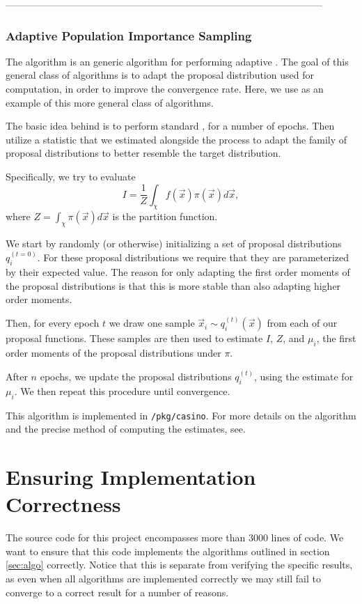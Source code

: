 \documentclass[10pt, a4paper]{article}
\begin{document}
  --------------------------------------------------------------------------------------------------

  \subsubsection{Adaptive Population Importance Sampling}
  The \apis{} algorithm is an generic algorithm for performing adaptive \is{}. The goal
  of this general class of algorithms is to adapt the proposal distribution used for computation, in
  order to improve the convergence rate. Here, we use \apis{} as an example of this more general class
  of algorithms.

  The basic idea behind \apis{} is to perform standard \is{}, for a number of epochs.
  Then utilize a statistic that we estimated alongside the \is{} process to adapt
  the family of proposal distributions to better resemble the target distribution\cite{apis}.

  Specifically, we try to evaluate
  \begin{equation}
  I = \frac{1}{Z} \int_\chi f(\vec{x}) \pi(\vec{x}) d\vec{x},
  \end{equation}
  where $Z = \int_\chi \pi(\vec{x}) d\vec{x}$ is the partition function.

  We start by randomly (or otherwise) initializing a set of proposal distributions $q_i^{(t=0)}$.
  For these proposal distributions we require that they are parameterized by their expected value\cite{apis}.
  The reason for only adapting the first order moments of the proposal distributions is that this is
  more stable than also adapting higher order moments\cite{apis}.

  Then, for every epoch $t$ we draw one sample $\vec{x}_i \sim q_i^{(t)}(\vec{x})$ from each
  of our proposal functions. These samples are then used to estimate $I$, $Z$, and $\mu_i$, the first
  order moments of the proposal distributions under $\pi$.

  After $n$ epochs, we update the proposal distributions $q_i^{(t)}$, using the estimate for $\mu_i$.
  We then repeat this procedure until convergence.

  This algorithm is implemented in \texttt{/pkg/casino}. For more details on the algorithm and the
  precise method of computing the estimates, see\cite{apis}.

\section{Ensuring Implementation Correctness}
  The source code for this project encompasses more than $3000$ lines of code. We want to ensure that
  this code implements the algorithms outlined in section \ref{sec:algo} correctly. Notice that this is separate
  from verifying the specific results, as even when all algorithms are implemented correctly we may
  still fail to converge to a correct result for a number of reasons\cite{nr}.
\end{document}
